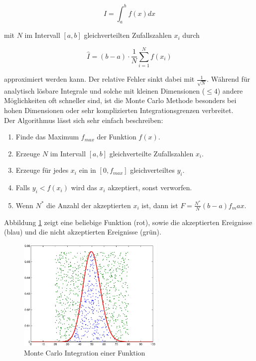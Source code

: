 \documentclass{book}
\begin{document}
\begin{refsection}
\begin{equation}
	I = \int_a^b f(x) dx
\end{equation} 

mit $N$ im Intervall $[a,b]$ gleichverteilten Zufallszahlen $x_i$ durch

\begin{equation}
	\hat{I} = (b-a) \cdot \frac{1}{N} \sum_{i=1}^{N} f(x_i)
\end{equation}

approximiert werden kann. Der relative Fehler sinkt dabei mit $\frac{1}{\sqrt{N}}$. Während für analytisch lösbare Integrale und solche mit kleinen Dimensionen ($\leq 4$) andere Möglichkeiten oft schneller sind, ist die Monte Carlo Methode besonders bei hohen Dimensionen oder sehr komplizierten Integrationsgrenzen verbreitet. \\

Der Algorithmus lässt sich sehr einfach beschreiben:

\begin{enumerate}
	\item Finde das Maximum $f_{max}$ der Funktion $f(x)$.
	\item Erzeuge $N$ im Intervall $[a,b]$ gleichverteilte Zufallszahlen $x_i$.
	\item Erzeuge für jedes $x_i$ ein in $[0,f_{max}]$ gleichverteiltes $y_i$.
	\item Falls $y_i < f(x_i)$ wird das $x_i$ akzeptiert, sonst verworfen.
	\item Wenn $N^*$ die Anzahl der akzeptierten $x_i$ ist, dann ist $F = \frac{N^*}{N}(b-a)f_max$.
\end{enumerate}

Abbildung \ref{fig:integration_histogram} zeigt eine beliebige Funktion (rot), sowie die akzeptierten Ereignisse (blau) und die nicht akzeptierten Ereignisse (grün). \\

\begin{figure}[htbp]
	\centering
	\includegraphics[width=7cm]{images/integration_poisson.eps}
	\caption{Monte Carlo Integration einer Funktion}
	\label{fig:integration_histogram}
\end{figure}


\end{refsection}
\end{document}
